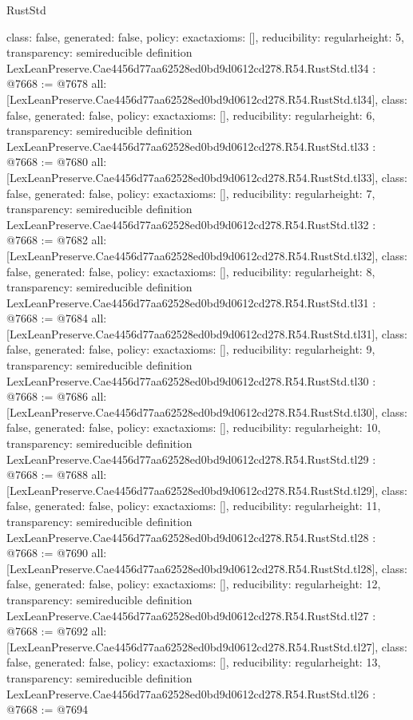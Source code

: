 \begin{lexlean}{RustStd}
\begin{coremodule}
{  class: false,
  generated: false,
  policy: exact{axioms: []},
  reducibility: regular{height: 5},
  transparency: semireducible
}
definition LexLeanPreserve.Cae4456d77aa62528ed0bd9d0612cd278.R54.RustStd.tl34 : @7668 := @7678 {
  all: [LexLeanPreserve.Cae4456d77aa62528ed0bd9d0612cd278.R54.RustStd.tl34],
  class: false,
  generated: false,
  policy: exact{axioms: []},
  reducibility: regular{height: 6},
  transparency: semireducible
}
definition LexLeanPreserve.Cae4456d77aa62528ed0bd9d0612cd278.R54.RustStd.tl33 : @7668 := @7680 {
  all: [LexLeanPreserve.Cae4456d77aa62528ed0bd9d0612cd278.R54.RustStd.tl33],
  class: false,
  generated: false,
  policy: exact{axioms: []},
  reducibility: regular{height: 7},
  transparency: semireducible
}
definition LexLeanPreserve.Cae4456d77aa62528ed0bd9d0612cd278.R54.RustStd.tl32 : @7668 := @7682 {
  all: [LexLeanPreserve.Cae4456d77aa62528ed0bd9d0612cd278.R54.RustStd.tl32],
  class: false,
  generated: false,
  policy: exact{axioms: []},
  reducibility: regular{height: 8},
  transparency: semireducible
}
definition LexLeanPreserve.Cae4456d77aa62528ed0bd9d0612cd278.R54.RustStd.tl31 : @7668 := @7684 {
  all: [LexLeanPreserve.Cae4456d77aa62528ed0bd9d0612cd278.R54.RustStd.tl31],
  class: false,
  generated: false,
  policy: exact{axioms: []},
  reducibility: regular{height: 9},
  transparency: semireducible
}
definition LexLeanPreserve.Cae4456d77aa62528ed0bd9d0612cd278.R54.RustStd.tl30 : @7668 := @7686 {
  all: [LexLeanPreserve.Cae4456d77aa62528ed0bd9d0612cd278.R54.RustStd.tl30],
  class: false,
  generated: false,
  policy: exact{axioms: []},
  reducibility: regular{height: 10},
  transparency: semireducible
}
definition LexLeanPreserve.Cae4456d77aa62528ed0bd9d0612cd278.R54.RustStd.tl29 : @7668 := @7688 {
  all: [LexLeanPreserve.Cae4456d77aa62528ed0bd9d0612cd278.R54.RustStd.tl29],
  class: false,
  generated: false,
  policy: exact{axioms: []},
  reducibility: regular{height: 11},
  transparency: semireducible
}
definition LexLeanPreserve.Cae4456d77aa62528ed0bd9d0612cd278.R54.RustStd.tl28 : @7668 := @7690 {
  all: [LexLeanPreserve.Cae4456d77aa62528ed0bd9d0612cd278.R54.RustStd.tl28],
  class: false,
  generated: false,
  policy: exact{axioms: []},
  reducibility: regular{height: 12},
  transparency: semireducible
}
definition LexLeanPreserve.Cae4456d77aa62528ed0bd9d0612cd278.R54.RustStd.tl27 : @7668 := @7692 {
  all: [LexLeanPreserve.Cae4456d77aa62528ed0bd9d0612cd278.R54.RustStd.tl27],
  class: false,
  generated: false,
  policy: exact{axioms: []},
  reducibility: regular{height: 13},
  transparency: semireducible
}
definition LexLeanPreserve.Cae4456d77aa62528ed0bd9d0612cd278.R54.RustStd.tl26 : @7668 := @7694 {
}
\end{coremodule}
\end{lexlean}
